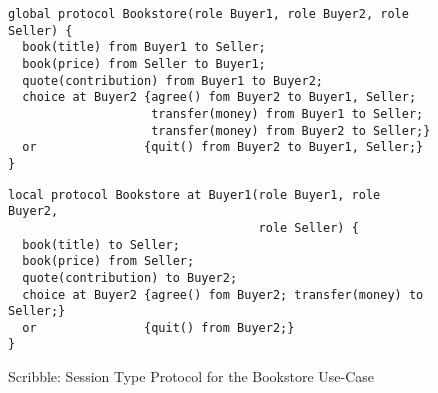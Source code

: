 \begin{figure}[t]
\begin{lstlisting}
global protocol Bookstore(role Buyer1, role Buyer2, role Seller) {
  book(title) from Buyer1 to Seller;
  book(price) from Seller to Buyer1;
  quote(contribution) from Buyer1 to Buyer2;
  choice at Buyer2 {agree() fom Buyer2 to Buyer1, Seller;
                    transfer(money) from Buyer1 to Seller;
                    transfer(money) from Buyer2 to Seller;}
  or               {quit() from Buyer2 to Buyer1, Seller;}
}
\end{lstlisting}


\begin{lstlisting}
local protocol Bookstore at Buyer1(role Buyer1, role Buyer2,
                                   role Seller) {
  book(title) to Seller;
  book(price) from Seller;
  quote(contribution) to Buyer2;
  choice at Buyer2 {agree() fom Buyer2; transfer(money) to Seller;}
  or               {quit() from Buyer2;}
}
\end{lstlisting}

\caption{Scribble: Session Type Protocol for the Bookstore Use-Case}
\label{fig:scribble_bs}
\end{figure}
